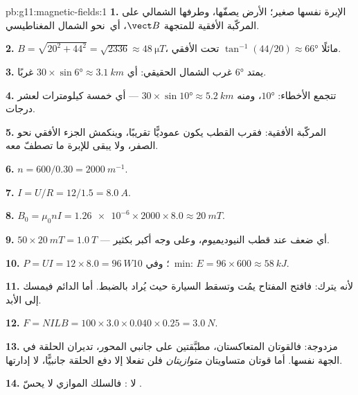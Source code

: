 \begin{solution}{pb:g11:magnetic-fields:1}
\textbf{1.} الإبرة نفسها  صغير؛  الأرض
يصفّها، وطرفها الشمالي على المركّبة الأفقية للمتجهة $\vect B$،
أي\ نحو الشمال المغناطيسي.

\textbf{2.} $B = \sqrt{20^2 + 44^2} = \sqrt{2336} \approx
\qty{48}{\micro T}$، مائلًا $\tan^{-1}(44/20) \approx \ang{66}$ تحت
الأفقي.

\textbf{3.} يمتد  $\ang{6}$ غرب الشمال الحقيقي:
أي $30 \times \sin\ang{6} \approx \qty{3.1}{km}$ غربًا.

\textbf{4.} تتجمع الأخطاء: $\ang{10}$، ومنه $30 \times \sin\ang{10} \approx
\qty{5.2}{km}$ --- أي خمسة كيلومترات لعشر درجات.

\textbf{5.} المركّبة الأفقية: فقرب القطب يكون 
عموديًّا تقريبًا، وينكمش الجزء الأفقي نحو الصفر، ولا
يبقى للإبرة ما تصطفّ معه.

\textbf{6.} $n = 600/0.30 = \qty{2000}{m^{-1}}$.

\textbf{7.} $I = U/R = 12/1.5 = \qty{8.0}{A}$.

\textbf{8.} $B_0 = \mu_0 n I = \num{1.26e-6} \times 2000 \times 8.0
\approx \qty{20}{mT}$.

\textbf{9.} $50 \times \qty{20}{mT} = \qty{1.0}{T}$ --- أي ضعف
 عند قطب النيوديميوم، وعلى وجه أكبر بكثير.

\textbf{10.} $P = UI = 12 \times 8.0 = \qty{96}{W}$؛ وفي
\qty{10}{\minute}: $E = 96 \times 600 \approx \qty{58}{kJ}$.

\textbf{11.} لأنه يترك: فافتح المفتاح يمُت  وتسقط
السيارة حيث يُراد بالضبط. أما  الدائم فيمسك إلى الأبد.

\textbf{12.} $F = NILB = 100 \times 3.0 \times 0.040 \times 0.25 =
\qty{3.0}{N}$.

\textbf{13.} مزدوجة: فالقوتان المتعاكستان، مطبَّقتين على جانبي
المحور، تديران الحلقة في الجهة نفسها. أما قوتان متساويتان \emph{متوازيتان}
فلن تفعلا إلا دفع الحلقة جانبيًّا، لا إدارتها.

\textbf{14.} لا : فالسلك الموازي  لا يحسّ .


\end{solution}
